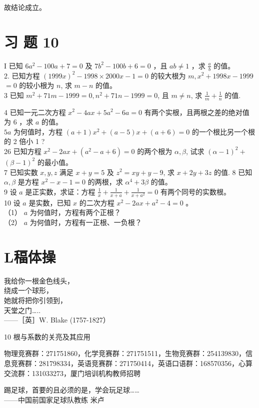 \documentclass[10pt]{article}
\begin{document}
故结论成立。

\section*{习 题 10}
I 已知 $6 a^{2}-100 a+7=0$ 及 $7 b^{2}-100 b+6=0$ ，且 $a b \neq 1$ ，求 $\frac{a}{b}$ 的值。\\
2. 已知方程 $(1999 x)^{2}-1998 \times 2000 x-1=0$ 的较大根为 $m, x^{2}+1998 x-1999$ $=0$ 的较小根为 $n$, 求 $m-n$ 的值。\\
3 已知 $m^{2}+71 m-1999=0, n^{2}+71 n-1999=0$, 且 $m \neq n$, 求 $\frac{1}{m}+\frac{1}{n}$ 的值.

4 已知一元二次方程 $x^{2}-4 a x+5 a^{2}-6 a=0$ 有两个实根，且两根之差的绝对值为 6 ，求 $a$ 的值。\\
$5 a$ 为何值时，方程 $(a+1) x^{2}+(a-5) x+(a+6)=0$ 的一个根比另一个根的 2 倍小 1 ?\\
26 已知方程 $x^{2}-2 a x+\left(a^{2}-a+6\right)=0$ 的两个根为 $\alpha, \beta$, 试求 $(\alpha-1)^{2}+$ $(\beta-1)^{2}$ 的最小值。\\
7 已知实数 $x, y, z$ 满足 $x+y=5$ 及 $z^{2}=x y+y-9$, 求 $x+2 y+3 z$ 的值. 8 已知 $\alpha, \beta$ 是方程 $x^{2}-x-1=0$ 的两根，求 $\alpha^{4}+3 \beta$ 的值。\\
9 设 $a$ 是正实数，求证：方程 $\frac{1}{x}+\frac{1}{x+a}+\frac{1}{x+a^{2}}=0$ 有两个同号的实数根。\\
10 设 $a$ 是实数，已知 $x$ 的二次方程 $x^{2}-2 a x+a^{2}-4=0$ 。\\
（1） $a$ 为何值时，方程有两个正根？\\
（2） $a$ 为何值时，方程有一正根、一负根？

\section*{L稫体操}
我给你一根金色线头，\\
绕成一个球形，\\
她就将把你引领到，\\
天堂之门…..\\
——［英］W. Blake (1757-1827）

10 根与系数的关亮及其应用

物理竞赛群：271751860，化学竞赛群：271751511，生物竞赛群：254139830，信息竞赛群：281798334，英语竞赛群：271750414，英语口语群：168570356，心算交流群：131033273，厦门培训机构教师招聘

踢足球，首要的且必须的是，学会玩足球……\\
——中国前国家足球队教练 米卢
\end{document}
